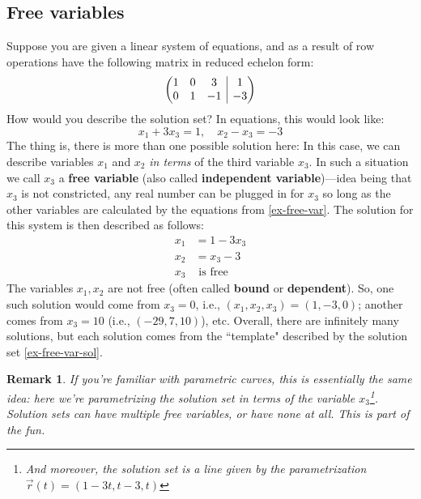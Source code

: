 \documentclass[12pt]{article}
\makeatletter
\numberwithin{equation}{subsection}
\numberwithin{figure}{subsection}
\theoremstyle{note}
\newtheorem{remark}[subsection]{Remark}
\newenvironment{amatrix}[1]{%
  \left(\begin{array}{@{}*{#1}{c}|c@{}}
}{%
  \end{array}\right)
}
\makeatother
\begin{document}
\subsection{Free variables}
Suppose you are given a linear system of equations, and as a result of row operations have the following matrix in reduced echelon form: \begin{equation} \begin{amatrix}{3} 1 & 0 & 3 & 1 \\ 0 & 1 & -1 & -3 \end{amatrix}\end{equation}
How would you describe the solution set? 
In equations, this would look like: \begin{equation} \label{ex-free-var} x_1 + 3x_3 = 1, \quad x_2-x_3=-3 \end{equation} The thing is, there is more than one possible solution here: In this case, we can describe variables $x_1$ and $x_2$ \textit{in terms} of the third variable $x_3$. In such a situation we call $x_3$ a \textbf{free variable} (also called \textbf{independent variable})---idea being that $x_3$ is not constricted, any real number can be plugged in for $x_3$ so long as the other variables are calculated by the equations from \eqref{ex-free-var}. The solution for this system is then described as follows:  \begin{align} x_1&=1-3x_3 \nonumber \\ x_2&=x_3-3 \nonumber  \\ x_3 &\text{ is free} \label{ex-free-var-sol} \end{align}
The variables $x_1,x_2$ are not free (often called \textbf{bound} or \textbf{dependent}). So, one such solution would come from $x_3=0$, i.e., $(x_1,x_2,x_3)=(1,-3,0)$; another comes from $x_3=10$ (i.e., $(-29, 7, 10)$), etc. Overall, there are infinitely many solutions, but each solution comes from the ``template" described by the solution set \eqref{ex-free-var-sol}. 

\begin{remark}If you're familiar with parametric curves, this is essentially the same idea: here we're parametrizing the solution set in terms of the variable $x_3$\footnote{And moreover, the solution set is a line given by the parametrization $\vec{r}(t)=(1-3t, t-3, t)$}. Solution sets can have multiple free variables, or have none at all. This is part of the fun. \end{remark}
\end{document}
